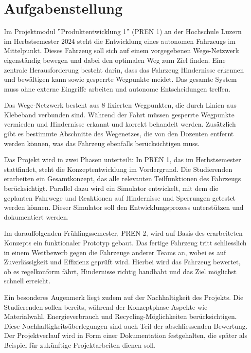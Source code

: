 \documentclass[../main.tex]{subfiles}
\begin{document}
\newpage
\section{Aufgabenstellung}
Im Projektmodul ''Produktentwicklung 1'' (PREN 1) an der Hochschule Luzern im Herbstsemester 2024 steht die Entwicklung eines autonomen Fahrzeugs im Mittelpunkt. Dieses Fahrzeug soll sich auf einem vorgegebenen Wege-Netzwerk eigenständig bewegen und dabei den optimalen Weg zum Ziel finden. Eine zentrale Herausforderung besteht darin, dass das Fahrzeug Hindernisse erkennen und bewältigen kann sowie gesperrte Wegpunkte meidet. Das gesamte System muss ohne externe Eingriffe arbeiten und autonome Entscheidungen treffen. 

Das Wege-Netzwerk besteht aus 8 fixierten Wegpunkten, die durch Linien aus Klebeband verbunden sind. Während der Fahrt müssen gesperrte Wegpunkte vermieden und Hindernisse erkannt und korrekt behandelt werden. Zusätzlich gibt es bestimmte Abschnitte des Wegenetzes, die von den Dozenten entfernt werden können, was das Fahrzeug ebenfalls berücksichtigen muss. 

Das Projekt wird in zwei Phasen unterteilt: In PREN 1, das im Herbstsemester stattfindet, steht die Konzeptentwicklung im Vordergrund. Die Studierenden erarbeiten ein Gesamtkonzept, das alle relevanten Teilfunktionen des Fahrzeugs berücksichtigt. Parallel dazu wird ein Simulator entwickelt, mit dem die geplanten Fahrwege und Reaktionen auf Hindernisse und Sperrungen getestet werden können. Dieser Simulator soll den Entwicklungsprozess unterstützen und dokumentiert werden. 

Im darauffolgenden Frühlingssemester, PREN 2, wird auf Basis des erarbeiteten Konzepts ein funktionaler Prototyp gebaut. Das fertige Fahrzeug tritt schliesslich in einem Wettbewerb gegen die Fahrzeuge anderer Teams an, wobei es auf Zuverlässigkeit und Effizienz geprüft wird. Hierbei wird das Fahrzeug bewertet, ob es regelkonform fährt, Hindernisse richtig handhabt und das Ziel möglichst schnell erreicht. 

Ein besonderes Augenmerk liegt zudem auf der Nachhaltigkeit des Projekts. Die Studierenden sollen bereits, während der Konzeptphase Aspekte wie Materialwahl, Energieverbrauch und Recycling-Möglichkeiten berücksichtigen. Diese Nachhaltigkeitsüberlegungen sind auch Teil der abschliessenden Bewertung. Der Projektverlauf wird in Form einer Dokumentation festgehalten, die später als Beispiel für zukünftige Projektarbeiten dienen soll.
\end{document}

